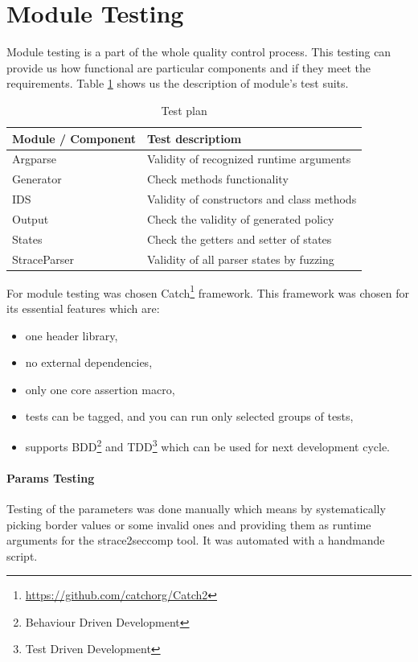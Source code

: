 \section{Module Testing}
Module testing is a part of the whole quality control process.
This testing can provide us how functional are particular components and if they meet the requirements.
Table \ref{table:moduletesting} shows us the description of module's test suits.

\begin{table}[h]
	\centering
	\begin{tabular}{||l|p{10cm}||}
		\hline
		\textbf{Module / Component}	&	\textbf{Test descriptiom} \\ \hline \hline
		Argparse					& Validity of recognized runtime arguments \\ \hline
		Generator					& Check methods functionality \\ \hline
		IDS							& Validity of constructors and class methods \\ \hline
		Output                      & Check the validity of generated policy \\ \hline
		States						& Check the getters and setter of states \\ \hline
		StraceParser				& Validity of all parser states by fuzzing \\ \hline
	\end{tabular}
	\caption{Test plan}
	\label{table:moduletesting}
\end{table}

For module testing was chosen Catch\footnote{\url{https://github.com/catchorg/Catch2}}
framework. This framework was chosen for its essential features which are:
\begin{itemize}
	\item one header library,
	\item no external dependencies,
	\item only one core assertion macro,
	\item tests can be tagged, and you can run only selected groups of tests,
	\item supports BDD\footnote{Behaviour Driven Development} and
	TDD\footnote{Test Driven Development} which can be used for next development
	cycle.
\end{itemize}

\paragraph{Params Testing}
Testing of the parameters was done manually which means by systematically
picking border values or some invalid ones and providing them as runtime
arguments for the strace2seccomp tool. It was automated with a handmande script.

